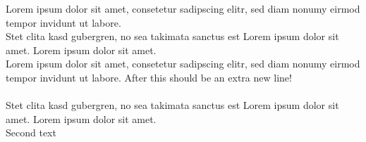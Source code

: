 \documentclass[11pt]{article}
\begin{document}
Lorem ipsum dolor sit amet, consetetur sadipscing elitr, sed diam nonumy eirmod tempor invidunt ut labore.\\Stet clita kasd gubergren, no sea takimata sanctus est Lorem ipsum dolor sit amet. Lorem ipsum dolor sit amet.\\Lorem ipsum dolor sit amet, consetetur sadipscing elitr, sed diam nonumy eirmod tempor invidunt ut labore. After this should be an extra new line!\\\\Stet clita kasd gubergren, no sea takimata sanctus est Lorem ipsum dolor sit amet. Lorem ipsum dolor sit amet.\\

Second text\\
\end{document}
